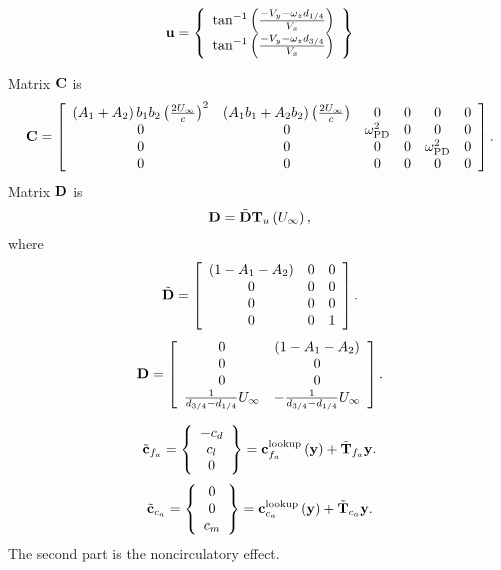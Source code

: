 		

\begin{equation}
	\bm{\mathbf{u}} = \left\{ \begin{array}{c} 
		\tan^{-1} \left(  \frac{-V_y - \omega_z d_{1/4}}{V_x} \right)\\
		\tan^{-1} \left(  \frac{-V_y - \omega_z d_{3/4}}{V_x} \right)\\
	 \end{array} \right\}
\end{equation}
		
Matrix $\bm{\mathbf{C}}$ is
\begin{equation}
	\bm{\mathbf{C}} = \left[
		\begin{array}{cccccc}
		\left(A_1+A_2\right)b_1 b_2 \left( \frac{2 U_\infty}{c}\right)^2 &
		 \left(A_1  b_1 + A_2 b_2 \right) \left( \frac{2 U_\infty}{c}\right) & 0 & 0 &0 & 0 \\
		0 & 0 & \omega_\text{PD}^2 & 0 & 0 & 0 \\
		0 & 0 & 0 & 0 & \omega_\text{PD}^2 & 0 \\
		0 & 0 & 0 & 0 & 0 & 0 
		\end{array}
		\right].
\end{equation}
Matrix $\bm{\mathbf{D}}$ is
\begin{equation}
	\bm{\mathbf{D}} = \tilde{\bm{\mathbf{D}}} \bm{\mathbf{T}}_u \left( U_\infty \right),
\end{equation}
where
\begin{equation}
	\tilde{\bm{\mathbf{D}}} = \left[
		\begin{array}{ccc}
		\left( 1 - A_1 - A_2 \right) & 0 & 0 \\
		0 & 0 & 0 \\
		0 & 0 & 0 \\
		0 & 0 & 1
		\end{array}
		\right].
\end{equation}
\begin{equation}
	\bm{\mathbf{D}} = \left[
		\begin{array}{cc}
		0 & \left( 1 -A_1 - A_2 \right) \\
		0 & 0 \\ 
		0 & 0 \\ 
		\frac{1}{d_{3/4}-d_{1/4}} U_\infty & 
		-\frac{1}{d_{3/4}-d_{1/4}} U_\infty \\ 
		\end{array}
		\right].
\end{equation}
	
\begin{equation}
	\tilde{\bm{\mathbf{c}}}_{f_{a}} = \left\{ \begin{array}{c} 
		-c_d \\
		c_l \\
		0
	 \end{array} \right\}
	= \bm{\mathbf{c}}_{f_a}^\text{lookup}\left( \bm{\mathbf{y}} \right) + \tilde{\bm{\mathbf{T}}}_{f_a} \bm{\mathbf{y}}.
\end{equation}
\begin{equation}
	\tilde{\bm{\mathbf{c}}}_{c_{a}} = \left\{
		\begin{array}{c}
		0 \\ 0 \\ c_{m}
		\end{array}
		\right\} = 
		\bm{\mathbf{c}}_{c_a}^\text{lookup}\left( \bm{\mathbf{y}} \right) + \tilde{\bm{\mathbf{T}}}_{c_a} \bm{\mathbf{y}}.
\end{equation}
The second part is the noncirculatory effect.

